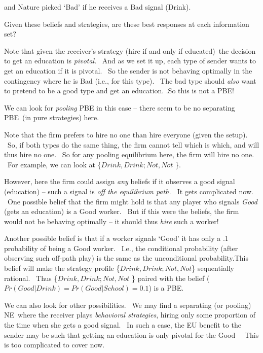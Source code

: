 \documentclass{article}
\begin{document}
and Nature picked `Bad' if he receives a Bad signal (Drink). \ 

\bigskip

Given these beliefs and strategies, are these best responses at each
information set?\bigskip

Note that given the receiver's strategy (hire if and only if educated)\ the
decision to get an education is \textit{pivotal}. \ And as we set it up,
each type of sender wants to get an education if it is pivotal. \ So the
sender is not behaving optimally in the contingency where he is Bad (i.e.,
for this type). \ The bad type should \textit{also} want to pretend to be a
good type and get an education. .So this is not a PBE!

\bigskip

We can look for \textit{pooling} PBE in this case -- there seem to be no
separating PBE\ (in pure strategies) here.

Note that the firm prefers to hire no one than hire everyone (given the
setup). \ So, if both types do the same thing, the firm cannot tell which is
which, and will thus hire no one. \ So for any pooling equilibrium here, the
firm will hire no one. \ For example, we can look at \{$Drink,Drink;Not,Not$%
\}.

\bigskip

However, here the firm could assign \textit{any} beliefs if it observes a
good signal (education) -- such a signal is \textit{off the equilibrium
path. \ }It gets complicated now. \ One possible belief that the firm might
hold is that any player who signals \textit{Good} (gets an education) is a
Good worker. \ But if this were the beliefs, the firm would not be behaving
optimally -- it should thus \textit{hire} such a worker!

\bigskip

Another possible belief is that if a worker signals `Good' it has only a $.1$
probability of being a Good worker. \ I.e., the conditional probability
(after observing such off-path play) is the same as the unconditional
probability.This belief will make the strategy profile \{$%
Drink,Drink;Not,Not $\} sequentially rational. \ Thus \{$Drink,Drink;Not,Not$%
\} paired with the belief ($Pr(Good|Drink)=Pr(Good|School)=0.1$) is a PBE.

\bigskip

We can also look for other possibilities. \ We may find a separating (or
pooling) NE\ where the receiver plays \textit{behavioral strategies}, hiring
only some proportion of the time when she gets a good signal. \ In such a
case, the EU benefit to the sender may be such that getting an education is
only pivotal for the Good \ \ This is too  complicated to cover now.
\end{document}
